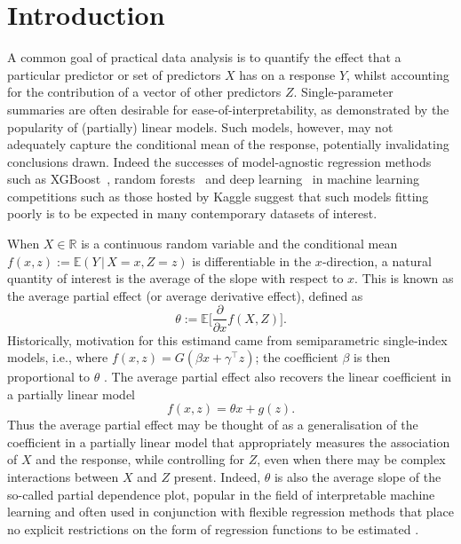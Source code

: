 \documentclass[aos]{imsart}
\newcommand{\R}{\mathbb{R}}
\newcommand{\E}{\mathbb{E}}
\newcommand{\given}{\,|\,}
\begin{document}
	
	
	\section{Introduction}
	\label{sec:intro}
	
	A common goal of practical data analysis is to quantify the effect that a particular predictor or set of predictors $X$ has on a response $Y$, whilst accounting for the contribution of a vector of other predictors $Z$. Single-parameter summaries are often desirable for ease-of-interpretability, as demonstrated by the popularity of (partially) linear models. Such models, however, may not adequately capture the conditional mean of the response, potentially invalidating conclusions drawn. Indeed the successes of model-agnostic regression methods such as XGBoost~\citep{xgboost}, random forests~\citep{breiman2001random} and deep learning~\citep{goodfellow2016deep} 
	in machine learning competitions such as those hosted by Kaggle \citep{bojer2021kaggle} suggest that such models fitting poorly is to be expected in many contemporary datasets of interest.
	
	When $X \in \R$ is a continuous random variable and the conditional mean $f(x, z) := \E(Y \given X=x, Z=z)$ is differentiable in the $x$-direction, a natural quantity of interest is the average of the slope with respect to $x$. This is known as the average partial effect (or average derivative effect), defined as 
	\begin{equation*}
		\theta := \E\bigg[\frac{\partial}{\partial x} f(X,Z)\bigg].
	\end{equation*}
Historically, motivation for this estimand came from semiparametric single-index models, i.e., where $f(x, z) = G(\beta x + \gamma^{\top} z)$; the coefficient $\beta$ is then proportional to $\theta$ \citep{StokerIndex,PowellIndex}. The average partial effect also recovers the linear coefficient in a partially linear model
		\begin{equation*}
			f(x,z)=\theta x + g(z).
		\end{equation*}
		Thus the average partial effect may be thought of as a generalisation of the coefficient in a partially linear model that appropriately measures the association of $X$ and the response, while controlling for $Z$, even when there may be complex interactions between $X$ and $Z$ present.
		Indeed, $\theta$ is also the average slope of the so-called partial dependence plot, popular in the field of interpretable machine learning and often used in conjunction with flexible regression methods that place no explicit restrictions on the form of regression functions to be estimated \citep{FriedmanGreedy, ZhaoInterpret, MolnarInterpret}.
	
\end{document}
